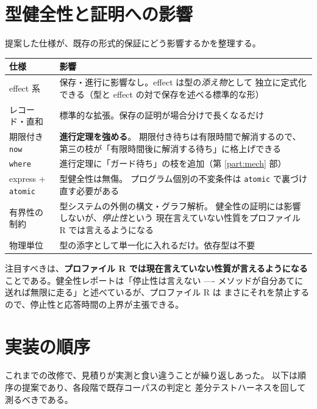 \documentclass[11pt,a4paper]{ltjsarticle}
\theoremstyle{remark}
\begin{document}
\section{型健全性と証明への影響}

提案した仕様が、既存の形式的保証にどう影響するかを整理する。

\begin{center}
\small
\begin{tabular}{@{}lp{8.6cm}@{}}
\toprule
仕様 & 影響 \\
\midrule
effect 系 & 保存・進行に影響なし。effect は型の\emph{添え物}として
  独立に定式化できる（型と effect の対で保存を述べる標準的な形） \\
レコード・直和 & 標準的な拡張。保存の証明が場合分けで長くなるだけ \\
期限付き \texttt{now} & \textbf{進行定理を強める}。
  期限付き待ちは有限時間で解消するので、
  第三の枝が「有限時間後に解消する待ち」に格上げできる \\
\texttt{where} & 進行定理に「ガード待ち」の枝を追加（第 \ref{part:mech} 部）\\
express + \texttt{atomic} & 型健全性は無傷。
  プログラム個別の不変条件は \texttt{atomic} で裏づけ直す必要がある \\
有界性の制約 & 型システムの外側の構文・グラフ解析。
  健全性の証明には影響しないが、\emph{停止性}という
  現在言えていない性質をプロファイル R では言えるようになる \\
物理単位 & 型の添字として単一化に入れるだけ。依存型は不要 \\
\bottomrule
\end{tabular}
\end{center}

注目すべきは、\textbf{プロファイル R では現在言えていない性質が言えるようになる}
ことである。健全性レポートは「停止性は言えない ---- メソッドが自分あてに
送れば無限に走る」と述べているが、プロファイル R は
まさにそれを禁止するので、停止性と応答時間の上界が主張できる。

\section{実装の順序}

これまでの改修で、見積りが実測と食い違うことが繰り返しあった。
以下は順序の提案であり、各段階で既存コーパスの判定と
差分テストハーネスを回して測るべきである。
\end{document}
